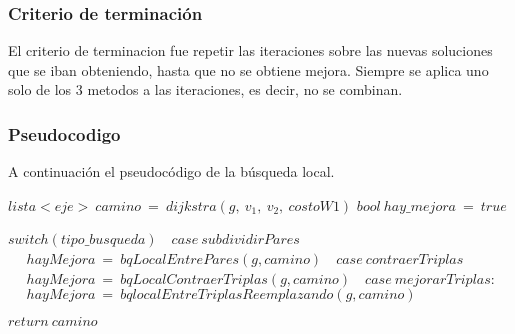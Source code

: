 \subsubsection{Criterio de terminaci\'on}
El criterio de terminacion fue repetir las iteraciones sobre las nuevas soluciones que se iban obteniendo, hasta que no se obtiene mejora.
Siempre se aplica uno solo de los 3 metodos a las iteraciones, es decir, no se combinan.

\subsubsection{Pseudocodigo}

A continuaci\'on el pseudoc\'odigo de la b\'usqueda local.
\begin{algorithmic}


 \State $lista<eje> \: camino\: =\: dijkstra(g, \:v_1,\: v_2, \:costoW1)$
 \State  $bool\: hay\_mejora\: = \:true$


  \State $switch(tipo\_busqueda)$
	\State$\: \: \: 	case\: subdividirPares$
		\State$\: \: \: \: \: 	\:hayMejora\: = \: bqLocalEntrePares(g,camino)$
	\State$	\: \: \: case\: contraerTriplas$		
		\State$\: \: \: \: \: 	\:hayMejora\: = \: bqLocalContraerTriplas(g,camino)$
	\State$	\: \: \: case \:mejorarTriplas:		$
		\State$\: \: \: \: \: 	\:hayMejora\: = \: bqlocalEntreTriplasReemplazando(g,camino)$

\EndWhile

 \State $return \:camino$

 \EndProcedure

\end{algorithmic}

